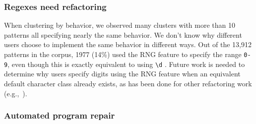 \subsubsection{Regexes need refactoring}
When clustering by behavior, we observed many clusters with more than 10 patterns all specifying nearly the same behavior.  We don't know why different users choose to implement the same behavior in different ways.  Out of the 13,912 patterns in the corpus, 1977 (14\%) used the RNG feature to specify the range \verb?0-9?, even though this is exactly equivalent to using \verb?\d? .  Future work is needed to determine why users specify digits using the RNG feature when an equivalent default character class already exists, as has been done for other refactoring work (e.g.,~\cite{StoleeTSE2013}).
\leavevmode\color{black}
\subsubsection{Automated program repair}















